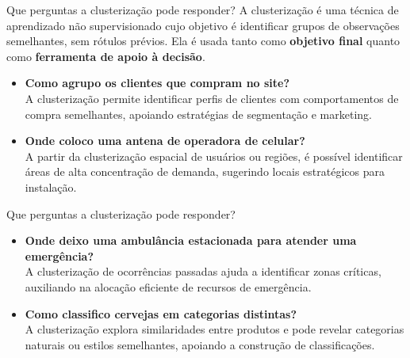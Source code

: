 \documentclass[
  ignorenonframetext,
  aspectratio=169,
]{beamer}
\providecommand{\tightlist}{%
  \setlength{\itemsep}{0pt}\setlength{\parskip}{0pt}}
\begin{document}
\begin{frame}{Que perguntas a clusterização pode responder?}
\protect{}\label{que-perguntas-a-clusterizauxe7uxe3o-pode-responder}
A clusterização é uma técnica de aprendizado não supervisionado cujo
objetivo é identificar grupos de observações semelhantes, sem rótulos
prévios. Ela é usada tanto como \textbf{objetivo final} quanto como
\textbf{ferramenta de apoio à decisão}.

\pause

\begin{itemize}
\tightlist
\item
  \textbf{Como agrupo os clientes que compram no site?}\\
  A clusterização permite identificar perfis de clientes com
  comportamentos de compra semelhantes, apoiando estratégias de
  segmentação e marketing.
\end{itemize}

\pause

\begin{itemize}
\tightlist
\item
  \textbf{Onde coloco uma antena de operadora de celular?}\\
  A partir da clusterização espacial de usuários ou regiões, é possível
  identificar áreas de alta concentração de demanda, sugerindo locais
  estratégicos para instalação.
\end{itemize}
\end{frame}

\begin{frame}{Que perguntas a clusterização pode responder?}
\protect{}\label{que-perguntas-a-clusterizauxe7uxe3o-pode-responder-1}
\begin{itemize}
\tightlist
\item
  \textbf{Onde deixo uma ambulância estacionada para atender uma
  emergência?}\\
  A clusterização de ocorrências passadas ajuda a identificar zonas
  críticas, auxiliando na alocação eficiente de recursos de emergência.
\end{itemize}

\pause

\begin{itemize}
\tightlist
\item
  \textbf{Como classifico cervejas em categorias distintas?}\\
  A clusterização explora similaridades entre produtos e pode revelar
  categorias naturais ou estilos semelhantes, apoiando a construção de
  classificações.
\end{itemize}
\end{frame}
\end{document}
